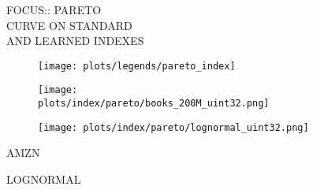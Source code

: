 \documentclass{article}
\begin{document}
\begin{figure}[!htbp]
\fbox
{
\begin{minipage}[t][0.98\textheight][t]{\textwidth}
\centering
    \begin{minipage}{0.23\linewidth}
    \footnotesize{FOCUS::  PARETO\\ CURVE ON STANDARD \\ AND LEARNED INDEXES}
    \end{minipage}
   \begin{minipage}{0.75\linewidth}
        \begin{figure}[H]
        \texttt{[image: plots/legends/pareto\_index]}
        \end{figure}
    \end{minipage}
    \vfill

   \begin{minipage}{0.48\linewidth}
        \begin{figure}[H]
        \texttt{[image: plots/index/pareto/books\_200M\_uint32.png]}
        \end{figure}
    \end{minipage}
    \begin{minipage}{0.48\linewidth}
        \begin{figure}[H]
        \texttt{[image: plots/index/pareto/lognormal\_uint32.png]}
        \end{figure}
    \end{minipage}
    \begin{minipage}{0.48\linewidth}
    \begin{center}
        AMZN
    \end{center}
    \end{minipage}
    \begin{minipage}{0.48\linewidth}
    \begin{center}
        LOGNORMAL
    \end{center}
    \end{minipage}

    \vfill


\end{minipage}}
\end{figure}
\end{document}
